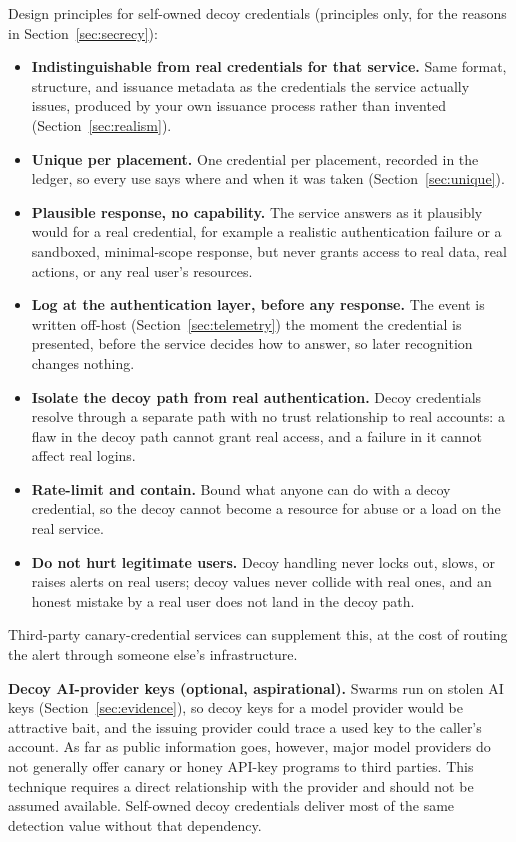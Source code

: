 \documentclass[11pt,letterpaper]{article}
\begin{document}
Design principles for self-owned decoy credentials (principles only, for the reasons in Section~\ref{sec:secrecy}):

\begin{itemize}
  \item \textbf{Indistinguishable from real credentials for that service.} Same format, structure, and issuance metadata as the credentials the service actually issues, produced by your own issuance process rather than invented (Section~\ref{sec:realism}).
  \item \textbf{Unique per placement.} One credential per placement, recorded in the ledger, so every use says where and when it was taken (Section~\ref{sec:unique}).
  \item \textbf{Plausible response, no capability.} The service answers as it plausibly would for a real credential, for example a realistic authentication failure or a sandboxed, minimal-scope response, but never grants access to real data, real actions, or any real user's resources.
  \item \textbf{Log at the authentication layer, before any response.} The event is written off-host (Section~\ref{sec:telemetry}) the moment the credential is presented, before the service decides how to answer, so later recognition changes nothing.
  \item \textbf{Isolate the decoy path from real authentication.} Decoy credentials resolve through a separate path with no trust relationship to real accounts: a flaw in the decoy path cannot grant real access, and a failure in it cannot affect real logins.
  \item \textbf{Rate-limit and contain.} Bound what anyone can do with a decoy credential, so the decoy cannot become a resource for abuse or a load on the real service.
  \item \textbf{Do not hurt legitimate users.} Decoy handling never locks out, slows, or raises alerts on real users; decoy values never collide with real ones, and an honest mistake by a real user does not land in the decoy path.
\end{itemize}

Third-party canary-credential services can supplement this, at the cost of routing the alert through someone else's infrastructure.

\textbf{Decoy AI-provider keys (optional, aspirational).} Swarms run on stolen AI keys (Section~\ref{sec:evidence}), so decoy keys for a model provider would be attractive bait, and the issuing provider could trace a used key to the caller's account. As far as public information goes, however, major model providers do not generally offer canary or honey API-key programs to third parties. This technique requires a direct relationship with the provider and should not be assumed available. Self-owned decoy credentials deliver most of the same detection value without that dependency.
\end{document}
